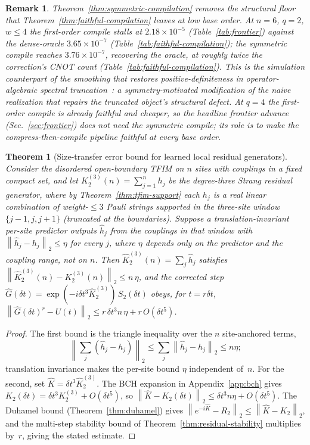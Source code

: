 \documentclass[aps,prxquantum,reprint,superscriptaddress,nofootinbib,amsmath,amssymb]{revtex4-2}
\newcommand{\tfim}{TFIM}
\newcommand{\norm}[1]{\left\lVert #1 \right\rVert}
\newcommand{\dt}{\delta t}
\newtheorem{theorem}{Theorem}
\newtheorem{remark}{Remark}
\begin{document}
\begin{remark}
Theorem~\ref{thm:symmetric-compilation} removes the structural floor that Theorem~\ref{thm:faithful-compilation} leaves at low base order. At $n=6$, $q=2$, $w\le4$ the first-order compile stalls at $2.18\times10^{-5}$ (Table~\ref{tab:frontier}) against the dense-oracle $3.65\times10^{-7}$ (Table~\ref{tab:faithful-compilation}); the symmetric compile reaches $3.76\times10^{-7}$, recovering the oracle, at roughly twice the correction's CNOT count (Table~\ref{tab:faithful-compilation}). This is the simulation counterpart of the smoothing that restores positive-definiteness in operator-algebraic spectral truncation~\cite{hashimoto2024spectral}: a symmetry-motivated modification of the naive realization that repairs the truncated object's structural defect. At $q=4$ the first-order compile is already faithful and cheaper, so the headline frontier advance (Sec.~\ref{sec:frontier}) does not need the symmetric compile; its role is to make the compress-then-compile pipeline faithful at \emph{every} base order.
\end{remark}

\begin{theorem}[Size-transfer error bound for learned local residual generators]
\label{thm:size-transfer}
Consider the disordered open-boundary \tfim{} on $n$ sites with couplings in a fixed compact set, and let $K_2^{(3)}(n)=\sum_{j=1}^{n} h_j$ be the degree-three Strang residual generator, where by Theorem~\ref{thm:tfim-support} each $h_j$ is a real linear combination of weight-$\le 3$ Pauli strings supported in the three-site window $\{j-1,j,j+1\}$ (truncated at the boundaries). Suppose a translation-invariant per-site predictor outputs $\widehat h_j$ from the couplings in that window with $\norm{\widehat h_j-h_j}_2\le\eta$ for every $j$, where $\eta$ depends only on the predictor and the coupling range, not on $n$. Then $\widehat K_2^{(3)}(n)=\sum_j\widehat h_j$ satisfies $\norm{\widehat K_2^{(3)}(n)-K_2^{(3)}(n)}_2\le n\,\eta$, and the corrected step $\widehat G(\dt)=\exp(-i\dt^3\widehat K_2^{(3)})\,S_2(\dt)$ obeys, for $t=r\dt$, $\norm{\widehat G(\dt)^r-U(t)}_2\le r\,\dt^3 n\,\eta + r\,O(\dt^5)$.
\end{theorem}
\begin{proof}
The first bound is the triangle inequality over the $n$ site-anchored terms,
\begin{equation*}
    \norm{\textstyle\sum_j(\widehat h_j-h_j)}_2\le\sum_j\norm{\widehat h_j-h_j}_2\le n\eta;
\end{equation*}
translation invariance makes the per-site bound $\eta$ independent of~$n$. For the second, set $\widehat K=\dt^3\widehat K_2^{(3)}$. The BCH expansion in Appendix~\ref{app:bch} gives $K_2(\dt)=\dt^3K_2^{(3)}+O(\dt^5)$, so $\norm{\widehat K-K_2(\dt)}_2\le\dt^3 n\eta+O(\dt^5)$. The Duhamel bound (Theorem~\ref{thm:duhamel}) gives $\norm{e^{-i\widehat K}-R_2}_2\le\norm{\widehat K-K_2}_2$, and the multi-step stability bound of Theorem~\ref{thm:residual-stability} multiplies by~$r$, giving the stated estimate.
\end{proof}
\end{document}
